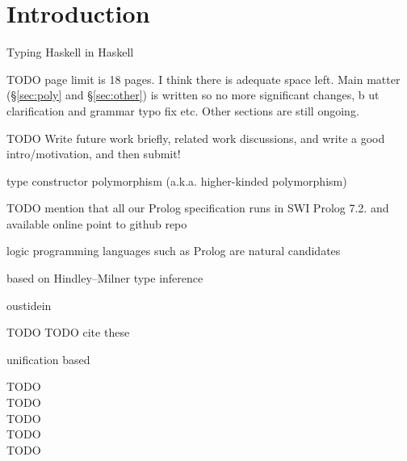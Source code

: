 \section{Introduction}\label{sec:intro}

Typing Haskell in Haskell

TODO page limit is 18 pages. I think there is adequate space left.
Main matter (\S\ref{sec:poly} and \S\ref{sec:other}) is written
so no more significant changes, b ut clarification and grammar typo fix etc.
Other sections are still ongoing.

TODO
Write future work briefly, related work discussions, and write a good intro/motivation,
and then submit!

type constructor polymorphism (a.k.a. higher-kinded polymorphism)

TODO mention that all our Prolog specification runs in SWI Prolog 7.2.
and available online point to github repo


logic programming languages such as Prolog are natural candidates

based on Hindley--Milner type inference


oustidein \cite{OutsideInICFP09}


TODO TODO cite these

unification based

TODO\\
TODO\\
TODO\\
TODO\\
TODO\\

